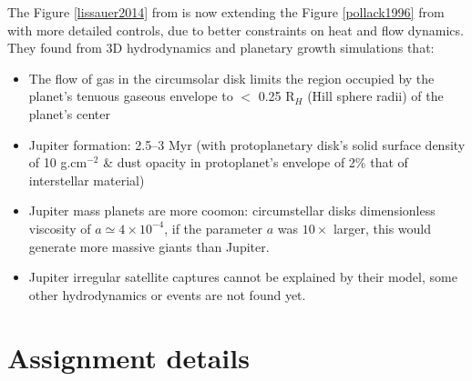 \documentclass[12pt]{article} %
\begin{document}
\noindent The Figure \ref{lissauer2014}  from \cite{lissauer2009models} is now extending the Figure \ref{pollack1996} from \cite{pollack1996formation}  with more detailed controls, due to better constraints on heat and flow dynamics. They found from 3D hydrodynamics and planetary growth simulations that: 

\begin{itemize}
\setlength\itemsep{0em}
\item  The flow of gas in the circumsolar disk limits the region occupied by the planet’s tenuous gaseous envelope to $<$
 0.25 R$_H$ (Hill sphere radii) of the planet’s center
 \item Jupiter formation: 2.5–3 Myr (with protoplanetary disk's solid surface density of 10 g.cm$^{-2}$ \& dust opacity in
protoplanet’s envelope of 2\% that of interstellar material)
\item Jupiter mass planets are more coomon: circumstellar disks dimensionless viscosity of $a \simeq 4 \times 10 ^{-4}$, if the parameter $a$ was $10 \times$ larger, this would generate more massive giants than Jupiter.
\item Jupiter irregular satellite captures cannot be explained by their model, some other hydrodynamics or events are not found yet. 
\end{itemize}

\clearpage
\section{Assignment details}\vspace{-2ex}\titlerule[1pt]\bigskip
\end{document}
